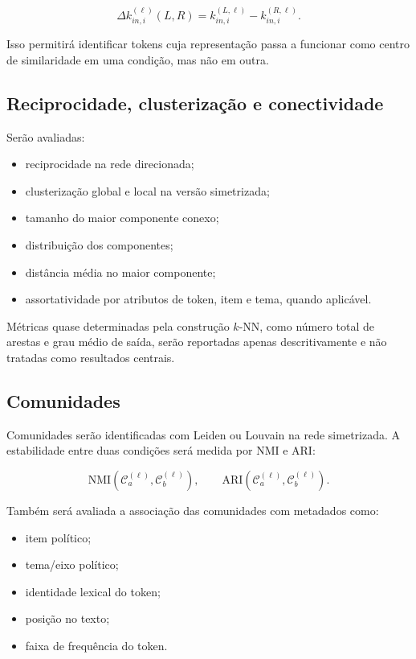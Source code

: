 \documentclass[11pt,a4paper]{article}
\begin{document}
\[
\Delta k_{in,i}^{(\ell)}(L,R)
=
k_{in,i}^{(L,\ell)}-k_{in,i}^{(R,\ell)}.
\]

Isso permitirá identificar tokens cuja representação passa a funcionar como centro de similaridade em uma condição, mas não em outra.

\subsection{Reciprocidade, clusterização e conectividade}

Serão avaliadas:

\begin{itemize}
    \item reciprocidade na rede direcionada;
    \item clusterização global e local na versão simetrizada;
    \item tamanho do maior componente conexo;
    \item distribuição dos componentes;
    \item distância média no maior componente;
    \item assortatividade por atributos de token, item e tema, quando aplicável.
\end{itemize}

Métricas quase determinadas pela construção $k$-NN, como número total de arestas e grau médio de saída, serão reportadas apenas descritivamente e não tratadas como resultados centrais.

\subsection{Comunidades}

Comunidades serão identificadas com Leiden ou Louvain na rede simetrizada. A estabilidade entre duas condições será medida por NMI e ARI:

\[
\mathrm{NMI}(\mathcal{C}_a^{(\ell)},\mathcal{C}_b^{(\ell)}),
\qquad
\mathrm{ARI}(\mathcal{C}_a^{(\ell)},\mathcal{C}_b^{(\ell)}).
\]

Também será avaliada a associação das comunidades com metadados como:

\begin{itemize}
    \item item político;
    \item tema/eixo político;
    \item identidade lexical do token;
    \item posição no texto;
    \item faixa de frequência do token.
\end{itemize}
\end{document}
